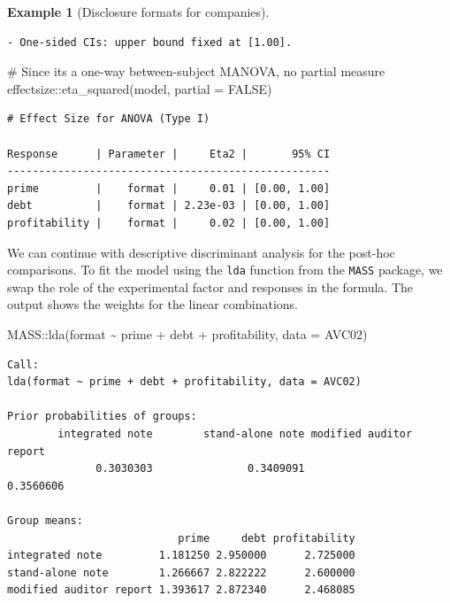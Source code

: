 \documentclass[
  11pt,
  letterpaper,
]{scrbook}
\newenvironment{Shaded}{\begin{snugshade}}{\end{snugshade}}
\newcommand{\AttributeTok}[1]{\textcolor[rgb]{0.40,0.45,0.13}{#1}}
\newcommand{\CommentTok}[1]{\textcolor[rgb]{0.37,0.37,0.37}{#1}}
\newcommand{\ConstantTok}[1]{\textcolor[rgb]{0.56,0.35,0.01}{#1}}
\newcommand{\FunctionTok}[1]{\textcolor[rgb]{0.28,0.35,0.67}{#1}}
\newcommand{\NormalTok}[1]{\textcolor[rgb]{0.00,0.23,0.31}{#1}}
\newcommand{\SpecialCharTok}[1]{\textcolor[rgb]{0.37,0.37,0.37}{#1}}
\theoremstyle{definition}
\newtheorem{example}{Example}[chapter]
\theoremstyle{definition}
\theoremstyle{remark}
\begin{document}
\begin{example}[Disclosure formats for
companies]
\begin{verbatim}
- One-sided CIs: upper bound fixed at [1.00].
\end{verbatim}

\begin{Shaded}
\begin{Highlighting}[]
\CommentTok{\# Since it\textquotesingle{}s a one{-}way between{-}subject MANOVA, no partial measure}
\NormalTok{effectsize}\SpecialCharTok{::}\FunctionTok{eta\_squared}\NormalTok{(model, }\AttributeTok{partial =} \ConstantTok{FALSE}\NormalTok{)}
\end{Highlighting}
\end{Shaded}

\begin{verbatim}
# Effect Size for ANOVA (Type I)

Response      | Parameter |     Eta2 |       95% CI
---------------------------------------------------
prime         |    format |     0.01 | [0.00, 1.00]
debt          |    format | 2.23e-03 | [0.00, 1.00]
profitability |    format |     0.02 | [0.00, 1.00]
\end{verbatim}

We can continue with descriptive discriminant analysis for the post-hoc
comparisons. To fit the model using the \texttt{lda} function from the
\texttt{MASS} package, we swap the role of the experimental factor and
responses in the formula. The output shows the weights for the linear
combinations.

\begin{Shaded}
\begin{Highlighting}[]
\NormalTok{MASS}\SpecialCharTok{::}\FunctionTok{lda}\NormalTok{(format }\SpecialCharTok{\textasciitilde{}}\NormalTok{ prime }\SpecialCharTok{+}\NormalTok{ debt }\SpecialCharTok{+}\NormalTok{ profitability,}
          \AttributeTok{data =}\NormalTok{ AVC02)}
\end{Highlighting}
\end{Shaded}

\begin{verbatim}
Call:
lda(format ~ prime + debt + profitability, data = AVC02)

Prior probabilities of groups:
        integrated note        stand-alone note modified auditor report 
              0.3030303               0.3409091               0.3560606 

Group means:
                           prime     debt profitability
integrated note         1.181250 2.950000      2.725000
stand-alone note        1.266667 2.822222      2.600000
modified auditor report 1.393617 2.872340      2.468085


\end{verbatim}
\end{example}
\end{document}
